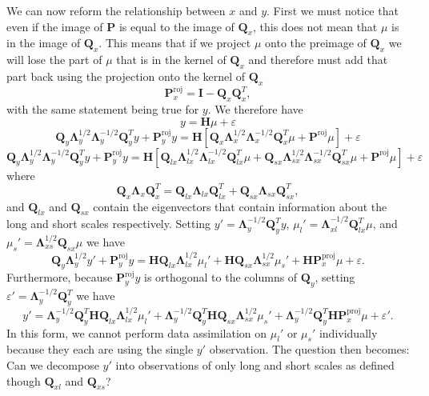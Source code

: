 \documentclass[11pt]{article} %
\newcommand{\mat}{\mathbf}
\begin{document}
We can now reform the relationship between $x$ and $y$.
First we must notice that even if the image of $\mat{P}$ is equal to
the image of $\mat{Q}_x$, this does not mean that $\mu$ is in the
image of $\mat{Q}_x$.
This means that if we project $\mu$ onto the preimage of $\mat{Q}_x$
we will lose the part of $\mu$ that is in the kernel of $\mat{Q}_x$
and therefore must add that part back using the projection onto the
kernel of $\mat{Q}_x$
\[
  \mat{P}^\text{roj}_x = \mat{I} - \mat{Q}_x \mat{Q}_x^T,
\]
with the same statement being true for $y$.
We therefore have
\[
  y = \mat{H} \mu + \varepsilon
\]
\[
  \mat{Q}_y \mat{\Lambda}_y^{1/2} \mat{\Lambda}_y^{-1/2} \mat{Q}_y^T y
  + \mat{P}^\text{roj}_y y
  = \mat{H}
  \left[
    \mat{Q}_x \mat{\Lambda}_x^{1/2} \mat{\Lambda}_x^{-1/2} \mat{Q}_x^T \mu
    + \mat{P}^\text{roj} \mu
  \right]
  + \varepsilon
\]
\[
  \mat{Q}_y \mat{\Lambda}_y^{1/2} \mat{\Lambda}_y^{-1/2} \mat{Q}_y^T y
  + \mat{P}^\text{roj}_y y
  = \mat{H}
  \left[
    \mat{Q}_{lx} \mat{\Lambda}_{lx}^{1/2} \mat{\Lambda}_{lx}^{-1/2}
    \mat{Q}_{lx}^T \mu
    + \mat{Q}_{sx} \mat{\Lambda}_{sx}^{1/2} \mat{\Lambda}_{sx}^{-1/2}
    \mat{Q}_{sx}^T \mu
    + \mat{P}^\text{roj} \mu
  \right]
  + \varepsilon
\]
where
\begin{equation}\label{eq:eig decomp decomp}
  \mat{Q}_x \mat{\Lambda}_x \mat{Q}_x^T
  = \mat{Q}_{lx} \mat{\Lambda}_{lx} \mat{Q}_{lx}^T
  + \mat{Q}_{sx} \mat{\Lambda}_{sx} \mat{Q}_{sx}^T,
\end{equation}
and $\mat{Q}_{lx}$ and $\mat{Q}_{sx}$ contain the eigenvectors that
contain information about the long and short scales
respectively.
Setting $y' = \mat{\Lambda}_y^{-1/2} \mat{Q}_y^T y$, $\mu_l' =
\mat{\Lambda}_{xl}^{-1/2} \mat{Q}_{lx}^T \mu$, and $\mu_s' =
\mat{\Lambda}_{xs}^{1/2} \mat{Q}_{sx} \mu$ we have
\[
  \mat{Q}_y \mat{\Lambda}_y^{1/2} y'
  + \mat{P}^\text{roj}_y y
  = \mat{H} \mat{Q}_{lx} \mat{\Lambda}_{lx}^{1/2} \mu_l'
  + \mat{H} \mat{Q}_{sx} \mat{\Lambda}_{sx}^{1/2} \mu_s'
  + \mat{H} \mat{P}^{\text{proj}}_x \mu
  + \varepsilon.
\]
Furthermore, because $\mat{P}^\text{roj}_y y$ is orthogonal to the
columns of $\mat{Q}_y$, setting $\varepsilon' = \mat{\Lambda}_y^{-1/2}
\mat{Q}_y^T$ we have
\begin{equation}\label{eq:prime decomp}
  y'
  = \mat{\Lambda}_y^{-1/2} \mat{Q}_y^T
  \mat{H} \mat{Q}_{lx} \mat{\Lambda}_{lx}^{1/2} \mu_l'
  + \mat{\Lambda}_y^{-1/2} \mat{Q}_y^T
  \mat{H} \mat{Q}_{sx} \mat{\Lambda}_{sx}^{1/2} \mu_s'
  + \mat{\Lambda}_y^{-1/2} \mat{Q}_y^T
  \mat{H} \mat{P}^{\text{proj}}_x \mu
  + \varepsilon'.
\end{equation}
In this form, we cannot perform data assimilation on $\mu_l'$ or
$\mu_s'$ individually because they each are using the single $y'$
observation.
The question then becomes: Can we decompose $y'$ into observations of
only long and short scales as defined though $\mat{Q}_{xl}$ and
$\mat{Q}_{xs}$?
\end{document}
